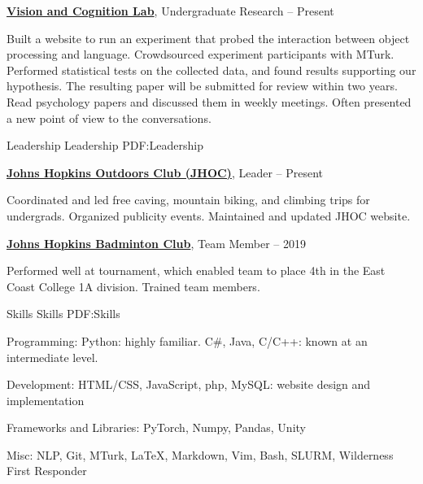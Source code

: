 \documentclass[letterpaper,MMMyyyy,nonstopmode,14pt]{simpleresumecv}
\begin{document}
\begin{Body}
\Gap
\Gap

\Entry
\href{https://www.halberdalab.net/}
    {\textbf{Vision and Cognition Lab}},
Undergraduate Research
\hfill
{} --
Present

\BulletItem Built a website to run an experiment that probed the interaction between object processing and language.
\BulletItem Crowdsourced experiment participants with MTurk.
\BulletItem Performed statistical tests on the collected data, and found results supporting our hypothesis. The resulting paper will be submitted for review within two years. 
\BulletItem Read psychology papers and discussed them in weekly meetings. Often presented a new point of view to the conversations. 




\Section
{Leadership}
{Leadership}
{PDF:Leadership}

\Entry
\href{http://outdoors.johnshopkins.edu}
{\textbf{Johns Hopkins Outdoors Club (JHOC)}},
Leader
\hfill
{} --
Present

\Gap
\BulletItem
Coordinated and led free caving, mountain biking, and climbing trips for undergrads. 
\BulletItem
Organized publicity events. 
\BulletItem
Maintained and updated JHOC website. 

\Gap
\Gap
\Entry
\href{https://johnshopkins.campuslabs.com/engage/organization/jhubadminton}
{\textbf{Johns Hopkins Badminton Club}},
Team Member
\hfill
{} --
2019

\Gap
\BulletItem Performed well at tournament, which enabled team to place 4th in the East Coast College 1A division. 
\BulletItem Trained team members. 


\Section
{Skills}
{Skills}
{PDF:Skills}

\BulletItem
Programming: Python: highly familiar. C\#, Java, C/C++: known at an intermediate level. 

\BulletItem
Development: HTML/CSS, JavaScript, php, MySQL: website design and implementation 

\BulletItem
Frameworks and Libraries: PyTorch, Numpy, Pandas, Unity

\BulletItem 
Misc: NLP, Git, MTurk, \LaTeX, Markdown, Vim, Bash, SLURM, Wilderness First Responder



\end{Body}
\end{document}
